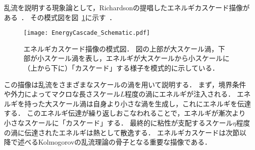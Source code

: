 乱流を説明する現象論として，Richardsonの提唱したエネルギカスケード描像がある~\cite{Goto2017a,GotoJPS2018}．
その模式図を図~\ref{fig:EnergyCascade_Schematic.pdf}に示す~\cite{gotolab}．
\begin{figure}[!t]
  \centering
  \texttt{[image: EnergyCascade\_Schematic.pdf]}
  \caption{
    エネルギカスケード描像の模式図．
    図の上部が大スケール渦，下部が小スケール渦を表し，エネルギが大スケールから小スケールに（上から下に）「カスケード」する様子を模式的に示している．
  }
  \label{fig:EnergyCascade_Schematic.pdf}
\end{figure}
この描像は乱流をさまざまなスケールの渦を用いて説明する．
まず，境界条件や外力によってマクロな長さスケール$L$程度の渦にエネルギが注入される．
エネルギを持った大スケール渦は自身より小さな渦を生成し，これにエネルギを伝達する．
このエネルギ伝達が繰り返しおこなわれることで，エネルギが漸次より小さなスケールに「カスケード」する．
最終的に粘性が支配するスケール$\eta$程度の渦に伝達されたエネルギは熱として散逸する．
エネルギカスケードは次節以降で述べるKolmogorovの乱流理論の骨子となる重要な描像である．
